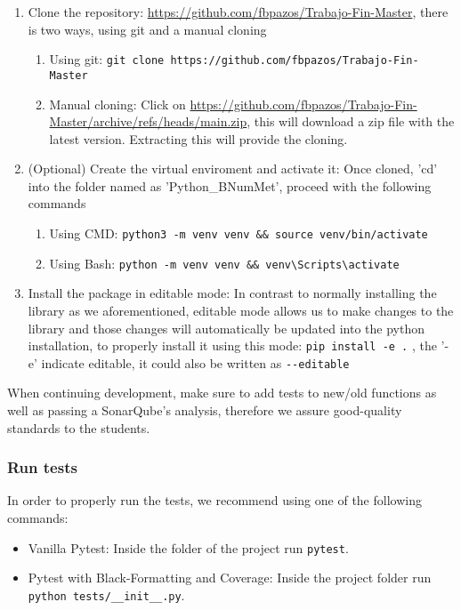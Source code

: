 \begin{enumerate}
       \item Clone the repository: \href{https://github.com/fbpazos/Trabajo-Fin-Master}{https://github.com/fbpazos/Trabajo-Fin-Master}, there is two ways, using git and a manual cloning
    \begin{enumerate}
        \item Using git: \lstinline|git clone https://github.com/fbpazos/Trabajo-Fin-Master|
        
        \item Manual cloning: Click on \href{https://github.com/fbpazos/Trabajo-Fin-Master/archive/refs/heads/main.zip}{https://github.com/fbpazos/Trabajo-Fin-Master/archive/refs/heads/main.zip}, this will download a zip file with the latest version. Extracting this will provide the cloning.
    \end{enumerate}

    \item (Optional) Create the virtual enviroment and activate it: Once cloned, 'cd' into the folder named as 'Python\_BNumMet', proceed with the following commands
    \begin{enumerate}
        \item Using CMD: \lstinline|python3 -m venv venv && source venv/bin/activate|
        \item Using Bash: \lstinline|python -m venv venv && venv\Scripts\activate|
    \end{enumerate}
    
    \item Install the package in editable mode: In contrast to normally installing the library as we aforementioned, editable mode allows us to make changes to the library and those changes will automatically be updated into the python installation, to properly install it using this mode: \lstinline|pip install -e .| , the '-e' indicate editable, it could also be written as \lstinline|--editable|

\end{enumerate}

When continuing development, make sure to add tests to new/old functions as well as passing a SonarQube's analysis, therefore we assure good-quality standards to the students.
\subsubsection*{Run tests}
In order to properly run the tests, we recommend using one of the following commands:
\begin{itemize}
    \item Vanilla Pytest: Inside the folder of the project run \lstinline|pytest|.
    \item Pytest with Black-Formatting and Coverage: Inside the project folder run \lstinline|python tests/__init__.py|.
\end{itemize}

